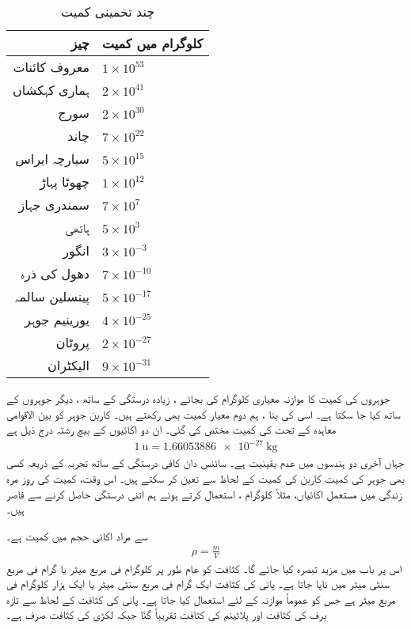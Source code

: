 \begin{table}[h!]
\caption{چند تخمینی کمیت}
\label{جدول_پیمائش_کمیت}
\centering
\begin{tabular}{rl}
\toprule
چیز & کلوگرام میں کمیت\\
\midrule
معروف کائنات & $1\times 10^{53}$\\
ہماری کہکشاں & $2\times 10^{41}$\\
سورج & $2\times 10^{30}$\\
چاند & $7\times 10^{22}$\\
سیارچہ ایراس& $5\times 10^{15}$\\
چھوٹا  پہاڑ & $1\times 10^{12}$\\
سمندری جہاز& $7\times10^{7}$\\
ہاتھی & $5\times10^{3}$\\
انگور & $3\times10^{-3}$\\
دھول کی ذرہ & $7\times10^{-10}$\\
پینسلین سالمہ & $5\times10^{-17}$\\
یورینیم جوہر & $4\times10^{-25}$\\
 پروٹان & $2\times10^{-27}$\\
 الیکٹران & $9\times10^{-31}$\\
 \bottomrule
\end{tabular}
\end{table}

جوہروں کی کمیت کا موازنہ معیاری کلوگرام کی بجائے ، زیادہ درستگی کے ساتھ ،  دیگر جوہروں کے ساتھ کیا جا سکتا ہے۔ اسی کی بنا ، ہم دوم معیار کمیت بھی رکھتے ہیں۔  کاربن  جوہر کو بین الاقوامی معاہدہ کے تحت    کی کمیت مختص کی گئی۔ ان دو اکائیوں کے بیچ رشتہ درج ذیل ہے
\begin{align}
\SI{1}{\atomicmassunit} = \SI{1.66053886e-27}{\kilogram}
\end{align}
جہاں آخری دو ہندسوں میں عدم یقینیت   ہے۔ سائنس دان کافی درستگی کے ساتھ تجربہ کے ذریعہ کسی بھی جوہر کی کمیت کاربن   کی کمیت کے لحاظ سے تعین کر سکتے ہیں۔ اس وقت،  کمیت کی روز مرہ زندگی میں مستعمل   اکائیاں، مثلاً کلوگرام ، استعمال کرتے ہوئے ہم اتنی درستگی حاصل کرنے سے قاصر ہیں۔

  سے مراد  اکائی حجم میں کمیت ہے۔
\begin{align}
\rho = \frac{m}{V}
\end{align}
اس پر باب   میں مزید تبصرہ کیا جائے گا۔ کثافت کو عام طور پر کلوگرام فی مربع میٹر یا گرام فی مربع سنٹی میٹر میں ناپا جاتا ہے۔ پانی کی کثافت ایک گرام فی مربع سنٹی میٹر یا ایک ہزار کلوگرام فی مربع میٹر ہے جس کو عموماً موازنہ کے لئے  استعمال کیا جاتا ہے۔ پانی کی کثافت کے لحاظ سے  تازہ برف  کی کثافت  اور پلاٹینم کی کثافت تقریباً   گنّا  جبکہ لکڑی کی کثافت صرف   ہے۔
